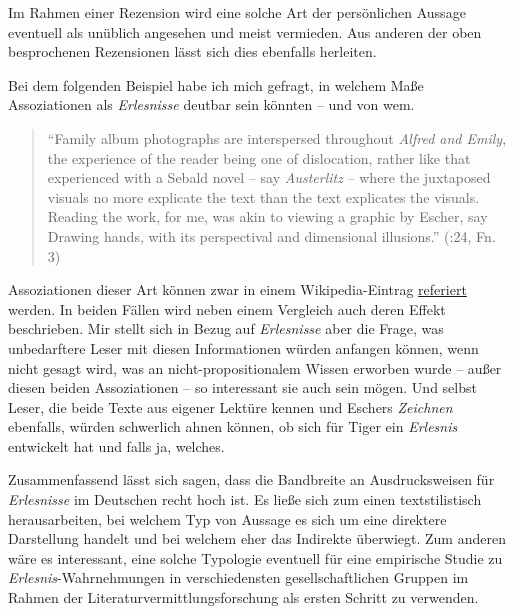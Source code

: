 \documentclass[fontsize=12pt]{scrartcl}
\begin{document}
Im Rahmen einer Rezension wird eine solche Art der pers\"onlichen Aussage eventuell als un\"ublich angesehen und meist vermieden. Aus anderen der oben besprochenen Rezensionen l\"asst sich dies ebenfalls herlei\-ten. 

Bei dem folgenden Beispiel habe ich mich gefragt, in welchem Ma{\ss}e Assoziationen als \textit{Erlesnisse} deutbar sein k\"onnten -- und von wem.

\singlespacing
\begin{quote}
"`Family album photographs are interspersed throughout \textit{Alfred and Emily}, the experience of the reader being one of dislocation, rather like that experienced with a Sebald novel -- say \textit{Austerlitz} -- where the juxtaposed visuals no more explicate the text than the text explicates the visuals. Reading the work, for me, was akin to viewing a graphic by Escher, say \flq Drawing hands\frq, with its perspectival and dimensional illusions."' (\cite{Tiger2009}:24, Fn. 3)
\end{quote}
\onehalfspacing

Assoziationen dieser Art k\"onnen zwar in einem Wi\-ki\-pe\-dia-Eintrag \href{https://de.wikipedia.org/wiki/Alfred_und_Emily\#Leseerlebnis}{referiert} werden. In beiden F\"allen wird neben einem Vergleich auch deren Effekt beschrie\-ben. Mir stellt sich in Bezug auf \textit{Erlesnisse} aber die Frage, was unbedarftere Leser\textsuperscript{\tiny *} mit diesen Informationen w\"urden anfangen k\"onnen, wenn nicht gesagt wird, was an nicht-pro\-po\-si\-ti\-o\-na\-lem Wissen erworben wurde -- au{\ss}er diesen beiden Assoziationen -- so interessant sie auch sein m\"ogen. Und \mbox{selbst} Leser\textsuperscript{\tiny *}, die beide Texte aus eigener Lekt\"ure kennen und Eschers \textit{Zeichnen} ebenfalls, w\"urden schwerlich ahnen k\"onnen, ob sich f\"ur Tiger ein \textit{Erlesnis} ent\-wickelt hat und falls ja, welches.

Zusammenfassend l\"asst sich sagen, dass die Bandbreite an Ausdrucksweisen f\"ur \textit{Erlesnisse} im Deutschen recht hoch ist. Es lie{\ss}e sich zum einen textstilistisch he\-rausarbei\-ten, bei welchem Typ von Aussage es sich um eine direktere Darstellung handelt und bei welchem eher das Indirekte \"uberwiegt. Zum anderen w\"are es interessant, eine solche Typologie eventuell f\"ur eine empirische Studie zu \textit{Erlesnis}-Wahrnehmungen in verschiedensten ge\-sell\-schaftlichen Gruppen im Rahmen der Li\-te\-ra\-tur\-ver\-mitt\-lungsfor\-schung als ersten Schritt zu verwenden. 
\end{document}
